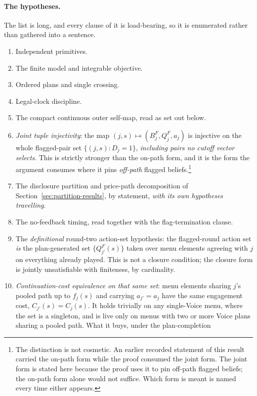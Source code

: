 \documentclass[11pt]{article}
\begin{document}
\paragraph{The hypotheses.} The list is long, and every clause of it is load-bearing, so it is
enumerated rather than gathered into a sentence.
\begin{enumerate}[label=(P-\arabic*),leftmargin=3.2em,itemsep=2pt]
\item Independent primitives.
\item The finite model and integrable objective.
\item Ordered plans and single crossing.
\item Legal-clock discipline.
\item The compact continuous outer self-map, read as set out below.
\item \emph{Joint tuple injectivity}: the map $(j,s)\mapsto(B_j^F,Q_j^F,a_j)$ is injective on the
  whole flagged-pair set $\{(j,s):D_j=1\}$, \emph{including pairs no cutoff vector selects}. This is
  strictly stronger than the on-path form, and it is the form the argument consumes where it pins
  \emph{off-path} flagged beliefs.\footnote{The distinction is not cosmetic. An earlier recorded
  statement of this result carried the on-path form while the proof consumed the joint form. The
  joint form is stated here because the proof uses it to pin off-path flagged beliefs; the on-path
  form alone would not suffice. Which form is meant is named every time either appears.}
\item The disclosure partition and price-path decomposition of Section~\ref{sec:partition-results},
  by statement, \emph{with its own hypotheses travelling}.
\item The no-feedback timing, read together with the flag-termination clause.
\item The \emph{definitional} round-two action-set hypothesis: the flagged-round action set \emph{is}
  the plan-generated set $\{Q_{j'}^F(s)\}$ taken over menu elements agreeing with $j$ on everything
  already played. This is not a closure condition; the closure form is jointly unsatisfiable with
  finiteness, by cardinality.
\item \emph{Continuation-cost equivalence on that same set}: menu elements sharing $j$'s pooled path
  up to $f_j(s)$ and carrying $a_{j'}=a_j$ have the same engagement cost, $C_{j'}(s)=C_j(s)$. It
  holds trivially on any single-Voice menu, where the set is a singleton, and is live only on menus
  with two or more Voice plans sharing a pooled path. What it buys, under the plan-completion

\end{enumerate}
\end{document}
